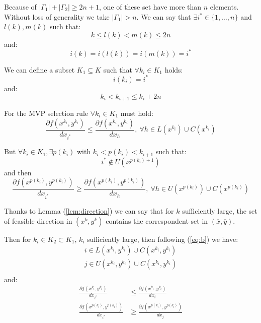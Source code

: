 Because of $|\Gamma_1|+|\Gamma_2|\ge2n+1$, one of these set have more than $n$ elements. Without loss of generality we take $|\Gamma_1|> n$.
 We can say that $\exists i^* \in \{1,\ldots,n\}$ and $l(k),m(k)$ such that:
 \begin{equation}
  k\le l(k) <m(k)\le2 n
 \end{equation}
and:
\begin{equation}
 i(k) = i(l(k))=i(m(k))=i^*
\end{equation}

We can define a subset $K_1 \subseteq K$ such that $\forall k_i \in K_1$ holds:
\begin{equation}
 i(k_i)=i^*
\end{equation}
and:
\begin{equation}
 k_i <k_{i+1} \le k_i+2n
\end{equation}


For the MVP selection rule $\forall k_i \in K_1$ must hold:
\begin{equation}
 \frac{\partial f(x^{k_i},y^{k_i})}{dx_{i^*}} \le \frac{\partial f(x^{k_i},y^{k_i})}{dx_{h}}, \ \forall h \in L(x^{k_i}) \cup C(x^{k_i})
\end{equation}

But  $\forall k_i \in K_1,\exists p(k_i)$ with  $k_i <p(k_i)<k_{i+1}$ such that:
\begin{equation}
 i^* \not \in U(x^{p(k_i)+1})
\end{equation}
and then
\begin{equation}
 \frac{\partial f(x^{p(k_i)},y^{p(k_i)})}{dx_{i^*}} \ge \frac{\partial f(x^{p(k_i)},y^{p(k_i)})}{dx_{h}}, \ \forall h \in U(x^{p(k_i)}) \cup C(x^{p(k_i)})
\end{equation}


Thanks to Lemma (\ref{lem:direction}) we can say that for $k$ sufficiently large, the set of feasible direction in $(x^k,y^k)$ contains the correspondent set in $(\overline{x},\overline{y})$.

Then for $k_i \in K_2 \subset K_1$, $k_i$ sufficiently large, then following (\ref{eq:b}) we have:
\begin{equation}
\begin{aligned}
i \in L(x^{k_i},y^{k_i}) \cup C(x^{k_i},y^{k_i})\\
j \in U(x^{k_i},y^{k_i}) \cup C(x^{k_i},y^{k_i})\\
\end{aligned}
\end{equation}
and:
\begin{equation}\label{eq:direction1}
\begin{aligned}
 \frac{\partial f(x^{k_i},y^{k_i})}{dx_{i^*}} &\le \frac{\partial f(x^{k_i},y^{k_i})}{dx_{i}}\\
 \frac{\partial f(x^{p(k_i)},y^{p(k_i)})}{dx_{i^*}} &\ge \frac{\partial f(x^{p(k_i)},y^{p(k_i)})}{dx_{j}}
 \end{aligned}
\end{equation}

